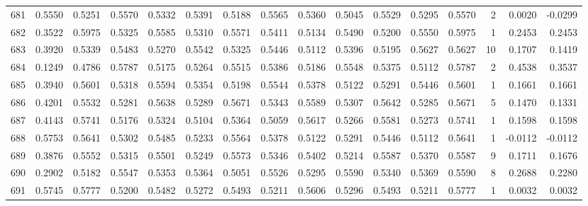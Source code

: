 \begin{tabular}{lrrrrrrrrrrrrrrr}
681 &      0.5550 &  0.5251 &  0.5570 &  0.5332 &  0.5391 &  0.5188 &  0.5565 &  0.5360 &  0.5045 &  0.5529 &   0.5295 &     0.5570 &      2 &                    0.0020 &                    -0.0299 \\
682 &      0.3522 &  0.5975 &  0.5325 &  0.5585 &  0.5310 &  0.5571 &  0.5411 &  0.5134 &  0.5490 &  0.5200 &   0.5550 &     0.5975 &      1 &                    0.2453 &                     0.2453 \\
683 &      0.3920 &  0.5339 &  0.5483 &  0.5270 &  0.5542 &  0.5325 &  0.5446 &  0.5112 &  0.5396 &  0.5195 &   0.5627 &     0.5627 &     10 &                    0.1707 &                     0.1419 \\
684 &      0.1249 &  0.4786 &  0.5787 &  0.5175 &  0.5264 &  0.5515 &  0.5386 &  0.5186 &  0.5548 &  0.5375 &   0.5112 &     0.5787 &      2 &                    0.4538 &                     0.3537 \\
685 &      0.3940 &  0.5601 &  0.5318 &  0.5594 &  0.5354 &  0.5198 &  0.5544 &  0.5378 &  0.5122 &  0.5291 &   0.5446 &     0.5601 &      1 &                    0.1661 &                     0.1661 \\
686 &      0.4201 &  0.5532 &  0.5281 &  0.5638 &  0.5289 &  0.5671 &  0.5343 &  0.5589 &  0.5307 &  0.5642 &   0.5285 &     0.5671 &      5 &                    0.1470 &                     0.1331 \\
687 &      0.4143 &  0.5741 &  0.5176 &  0.5324 &  0.5104 &  0.5364 &  0.5059 &  0.5617 &  0.5266 &  0.5581 &   0.5273 &     0.5741 &      1 &                    0.1598 &                     0.1598 \\
688 &      0.5753 &  0.5641 &  0.5302 &  0.5485 &  0.5233 &  0.5564 &  0.5378 &  0.5122 &  0.5291 &  0.5446 &   0.5112 &     0.5641 &      1 &                   -0.0112 &                    -0.0112 \\
689 &      0.3876 &  0.5552 &  0.5315 &  0.5501 &  0.5249 &  0.5573 &  0.5346 &  0.5402 &  0.5214 &  0.5587 &   0.5370 &     0.5587 &      9 &                    0.1711 &                     0.1676 \\
690 &      0.2902 &  0.5182 &  0.5547 &  0.5353 &  0.5364 &  0.5051 &  0.5526 &  0.5295 &  0.5590 &  0.5340 &   0.5369 &     0.5590 &      8 &                    0.2688 &                     0.2280 \\
691 &      0.5745 &  0.5777 &  0.5200 &  0.5482 &  0.5272 &  0.5493 &  0.5211 &  0.5606 &  0.5296 &  0.5493 &   0.5211 &     0.5777 &      1 &                    0.0032 &                     0.0032 \\

\end{tabular}
